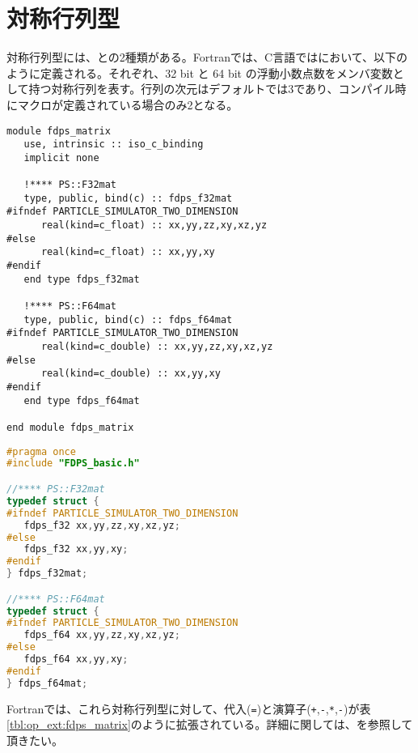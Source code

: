 

\section{対称行列型}
\label{sec:symmetric_matrix_types}
対称行列型には、との2種類がある。Fortranでは、C言語ではにおいて、以下のように定義される。それぞれ、32 bit と 64 bit の浮動小数点数をメンバ変数として持つ対称行列を表す。行列の次元はデフォルトでは3であり、コンパイル時にマクロが定義されている場合のみ2となる。

\begin{lstlisting}[caption=対称行列型 (Fortran)]
module fdps_matrix
   use, intrinsic :: iso_c_binding
   implicit none

   !**** PS::F32mat
   type, public, bind(c) :: fdps_f32mat
#ifndef PARTICLE_SIMULATOR_TWO_DIMENSION
      real(kind=c_float) :: xx,yy,zz,xy,xz,yz
#else
      real(kind=c_float) :: xx,yy,xy
#endif
   end type fdps_f32mat

   !**** PS::F64mat
   type, public, bind(c) :: fdps_f64mat
#ifndef PARTICLE_SIMULATOR_TWO_DIMENSION
      real(kind=c_double) :: xx,yy,zz,xy,xz,yz
#else
      real(kind=c_double) :: xx,yy,xy
#endif
   end type fdps_f64mat

end module fdps_matrix  
\end{lstlisting}

\begin{lstlisting}[language=C,caption=対称行列型 (C言語)]
#pragma once
#include "FDPS_basic.h"

//**** PS::F32mat
typedef struct {
#ifndef PARTICLE_SIMULATOR_TWO_DIMENSION
   fdps_f32 xx,yy,zz,xy,xz,yz;
#else
   fdps_f32 xx,yy,xy;
#endif
} fdps_f32mat;

//**** PS::F64mat
typedef struct {
#ifndef PARTICLE_SIMULATOR_TWO_DIMENSION
   fdps_f64 xx,yy,zz,xy,xz,yz;
#else
   fdps_f64 xx,yy,xy;
#endif
} fdps_f64mat;
\end{lstlisting}

Fortranでは、これら対称行列型に対して、代入(\texttt{=})と演算子(\texttt{+},\texttt{-},\texttt{*},\texttt{-})が表\ref{tbl:op_ext:fdps_matrix}のように拡張されている。詳細に関しては、を参照して頂きたい。

